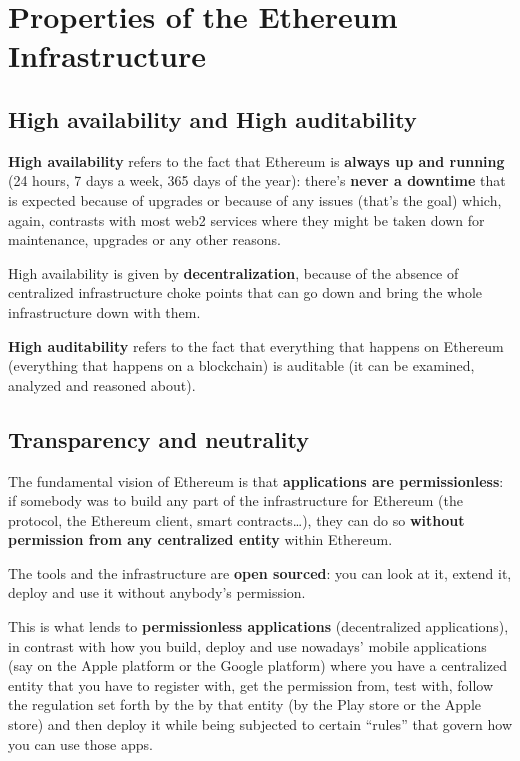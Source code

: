 \section{Properties of the Ethereum
Infrastructure}\label{properties-of-the-ethereum-infrastructure}

\subsection{High availability and High
auditability}\label{high-availability-and-high-auditability}

\textbf{High availability} refers to the fact that Ethereum is
\textbf{always up and running} (24 hours, 7 days a week, 365 days of the
year): there's \textbf{never a downtime} that is expected because of
upgrades or because of any issues (that's the goal) which, again,
contrasts with most web2 services where they might be taken down for
maintenance, upgrades or any other reasons.

High availability is given by \textbf{decentralization}, because of the
absence of centralized infrastructure choke points that can go down and
bring the whole infrastructure down with them.

\textbf{High auditability} refers to the fact that everything that
happens on Ethereum (everything that happens on a blockchain) is
auditable (it can be examined, analyzed and reasoned about).

\subsection{Transparency and
neutrality}\label{transparency-and-neutrality}

The fundamental vision of Ethereum is that \textbf{applications are
permissionless}: if somebody was to build any part of the infrastructure
for Ethereum (the protocol, the Ethereum client, smart contracts\ldots),
they can do so \textbf{without permission from any centralized entity}
within Ethereum.

The tools and the infrastructure are \textbf{open sourced}: you can look
at it, extend it, deploy and use it without anybody's permission.

This is what lends to \textbf{permissionless applications}
(decentralized applications), in contrast with how you build, deploy and
use nowadays' mobile applications (say on the Apple platform or the
Google platform) where you have a centralized entity that you have to
register with, get the permission from, test with, follow the regulation
set forth by the by that entity (by the Play store or the Apple store)
and then deploy it while being subjected to certain ``rules'' that
govern how you can use those apps.

